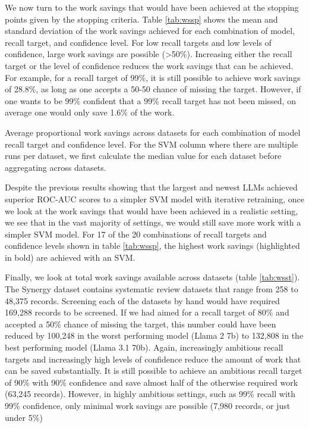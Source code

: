 \documentclass{article}
\begin{document}
	We now turn to the work savings that would have been achieved at the stopping points given by the stopping criteria. Table \ref{tab:wssp} shows the mean and standard deviation of the work savings achieved for each combination of model, recall target, and confidence level. For low recall targets and low levels of confidence, large work savings are possible (>50\%). Increasing either the recall target or the level of confidence reduces the work savings that can be achieved. For example, for a recall target of 99\%, it is still possible to achieve work savings of 28.8\%, as long as one accepts a 50-50 chance of missing the target. However, if one wants to be 99\% confident that a 99\% recall target has not been missed, on average one would only save 1.6\% of the work.
	
	\begin{table}
		\centering
		
		\caption{Average proportional work savings across datasets for each combination of  model recall target and confidence level. For the SVM column where there are multiple runs per dataset, we first calculate the median value for each dataset before aggregating across datasets.}
		\label{tab:wsst}
	\end{table}
	
	Despite the previous results showing that the largest and newest LLMs achieved superior ROC-AUC scores to a simpler SVM model with iterative retraining, once we look at the work savings that would have been achieved in a realistic setting, we see that in the vast majority of settings, we would still save more work with a simpler SVM model. For 17 of the 20 combinations of recall targets and confidence levels shown in table \ref{tab:wssp}, the highest work savings (highlighted in bold) are achieved with an SVM.
	
	Finally, we look at total work savings available across datasets (table \ref{tab:wsst}). The Synergy dataset contains systematic review datasets that range from 258 to 48,375 records. 
	Screening each of the datasets by hand would have required 169,288 records to be screened.	
	If we had aimed for a recall target of 80\% and accepted a 50\% chance of missing the target, this number could have been reduced by 100,248 in the worst performing model (Llama 2 7b) to 132,808 in the best performing model (Llama 3.1 70b).
	Again, increasingly ambitious recall targets and increasingly high levels of confidence reduce the amount of work that can be saved substantially. It is still possible to achieve an ambitious recall target of 90\% with 90\% confidence and save almost half of the otherwise required work (63,245 records). However, in highly ambitious settings, such as 99\% recall with 99\% confidence, only minimal work savings are possible (7,980 records, or just under 5\%)
\end{document}
